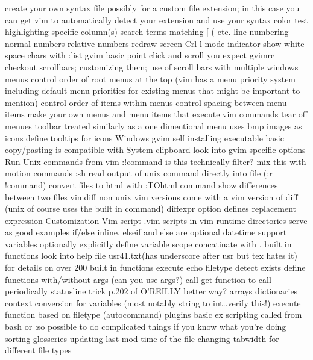 \documentclass[12pt]{book}
\begin{document}
{      create your own syntax file
        possibly for a custom file extension; in this case you can get vim to automatically detect your extension and use your syntax
    color test
  highlighting
    specific column(s)
    search terms
    matching { [ ( etc.
  line numbering
    normal numbers
    relative numbers
  redraw screen Crl-l
  mode indicator
  show white space chars with :list
  gvim
    basic point click and scroll you expect
    gvimrc
    checkout scrollbars; customizing them; use of scroll bars with multiple windows
    menus
      control order of root menus at the top (vim has a menu priority system including default menu priorities for existing menus that might be important to mention)
      control order of items within menus
      control spacing between menu items
      make your own menus and menu items that execute vim commands
      tear off menues
    toolbar
      treated similarly as a one dimentional menu
      uses bmp images as icons
      define tooltips for icons
    Windows gvim
      self installing executable
      basic copy/pasting is compatible with System clipboard
    look into gvim specific options
  Run Unix commands from vim
    :!command
      is this technically filter?
      mix this with motion commands
    :sh
    read output of unix command directly into file (:r !command)
  convert files to html with :TOhtml command
  show differences between two files
    vimdiff
    non unix vim versions come with a vim version of diff (unix of course uses the built in command)
    diffexpr option defines replacement expression
Customization
  Vim script
    .vim scripts in vim runtime directories serve as good examples
    if/else
      inline, elseif and else are optional
    datetime support
    variables
      optionally explicitly define variable scope
    concatinate with .
    built in functions
      look into help file usr41.txt(has underscore after usr but tex hates it) for details on over 200 built in functions
      execute
      echo
      filetype detect
      exists
    define functions
      with/without args (can you use args?)
      call
    get function to call periodically
      statusline trick p.202 of O'REILLY
      better way?
    arrays
    dictionaries
    context conversion for variables (most notably string to int..verify this!)
    execute function based on filetype (autocommand)
    plugins
    basic ex scripting called from bash or :so
      possible to do complicated things if you know what you're doing
        sorting glosseries
        updating last mod time of the file
        changing tabwidth for different file types
}}
\end{document}
